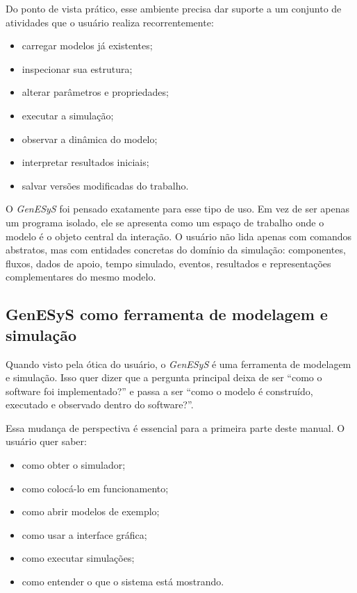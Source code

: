 Do ponto de vista prático, esse ambiente precisa dar suporte a um conjunto de atividades que o usuário realiza recorrentemente:

\begin{itemize}
    \item carregar modelos já existentes;
    \item inspecionar sua estrutura;
    \item alterar parâmetros e propriedades;
    \item executar a simulação;
    \item observar a dinâmica do modelo;
    \item interpretar resultados iniciais;
    \item salvar versões modificadas do trabalho.
\end{itemize}

O \textit{GenESyS} foi pensado exatamente para esse tipo de uso. Em vez de ser apenas um programa isolado, ele se apresenta como um espaço de trabalho onde o modelo é o objeto central da interação. O usuário não lida apenas com comandos abstratos, mas com entidades concretas do domínio da simulação: componentes, fluxos, dados de apoio, tempo simulado, eventos, resultados e representações complementares do mesmo modelo.

\subsection{GenESyS como ferramenta de modelagem e simulação}
\label{subsec:cap1_genesys_ferramenta}

Quando visto pela ótica do usuário, o \textit{GenESyS} é uma ferramenta de modelagem e simulação. Isso quer dizer que a pergunta principal deixa de ser ``como o software foi implementado?'' e passa a ser ``como o modelo é construído, executado e observado dentro do software?''.

Essa mudança de perspectiva é essencial para a primeira parte deste manual. O usuário quer saber:
\begin{itemize}
    \item como obter o simulador;
    \item como colocá-lo em funcionamento;
    \item como abrir modelos de exemplo;
    \item como usar a interface gráfica;
    \item como executar simulações;
    \item como entender o que o sistema está mostrando.
\end{itemize}

